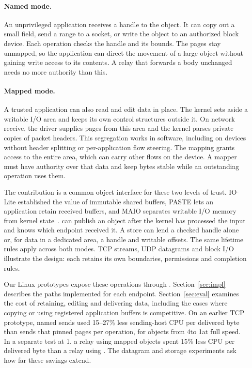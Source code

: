 \paragraph{Named mode.} An unprivileged application receives a handle to the
object. It can copy out a small field, send a range to a socket, or write the
object to an authorized block device. Each operation checks the handle and its
bounds. The pages stay unmapped, so the application can direct the movement of a
large object without gaining write access to its contents. A relay that forwards
a body unchanged needs no more authority than this.

\paragraph{Mapped mode.} A trusted application can also read and edit data in
place. The kernel sets aside a writable I/O area and keeps its own control
structures outside it. On network receive, the driver supplies pages from this
area and the kernel parses private copies of packet headers. This segregation
works in software, including on devices without header splitting or
per-application flow steering. The mapping grants access to the entire area,
which can carry other flows on the device. A mapper must have authority over
that data and keep bytes stable while an outstanding operation uses them.

The contribution is a common object interface for these two levels of trust.
IO-Lite established the value of immutable shared buffers, PASTE lets an
application retain received buffers, and MAIO separates writable I/O memory
from kernel state~\cite{iolite,paste,maio}. \sys can publish an object after the
kernel has processed the input and knows which endpoint received it. A store can
lend a checked handle alone or, for data in a dedicated area, a handle and writable offsets.
The same lifetime rules apply across both modes. TCP streams, UDP datagrams and
block I/O illustrate the design: each retains its own boundaries, permissions and
completion rules.

Our Linux prototypes expose these operations through \iouring.
Section~\ref{sec:impl} describes the paths implemented for each endpoint.
Section~\ref{sec:eval} examines the cost of retaining, editing and delivering data,
including the cases where copying or using registered application buffers is
competitive. On an earlier TCP prototype, named sends used 15--27\% less sending-host
CPU per delivered byte than sends that pinned pages per operation, for objects
from 4\KiB to 1\MiB at full speed. In a separate test at 1\GBs, a relay using
mapped objects spent 15\% less CPU per delivered byte than a relay using
\splice. The datagram and storage experiments ask how far these savings extend.
